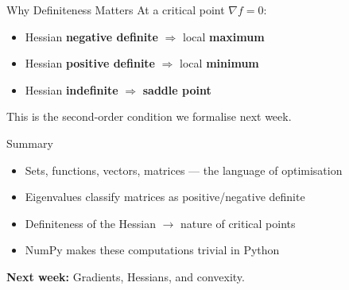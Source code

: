 \documentclass[aspectratio=169, 10pt]{beamer}
\begin{document}
\begin{frame}{Why Definiteness Matters}
At a critical point $\nabla f = 0$:\\\bigskip\begin{itemize}\item Hessian \textbf{negative definite} $\Rightarrow$ local \textbf{maximum}\item Hessian \textbf{positive definite} $\Rightarrow$ local \textbf{minimum}\item Hessian \textbf{indefinite} $\Rightarrow$ \textbf{saddle point}\end{itemize}\par\bigskip This is the \alert{second-order condition} we formalise next week.
\end{frame}

\begin{frame}{Summary}
\begin{itemize}\item Sets, functions, vectors, matrices --- the language of optimisation\item Eigenvalues classify matrices as positive/negative definite\item Definiteness of the Hessian $\to$ nature of critical points\item NumPy makes these computations trivial in Python\end{itemize}\par\bigskip\textbf{Next week:} Gradients, Hessians, and convexity.
\end{frame}
\end{document}
